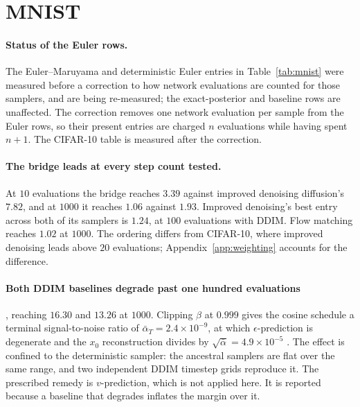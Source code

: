 \documentclass[11pt,a4paper]{article}
\begin{document}
\section{MNIST}
\label{sec:mnist}

\begin{table}[h]
\centering\small
\caption{MNIST, FID against the train split, $50\,000$ generated samples per
entry, floor $0.15$. Mean $\pm$ sd over sampling seeds where repeats were run; a
dash marks a cell not run.}
\label{tab:mnist}
\setlength{\tabcolsep}{4pt}
\resizebox{\textwidth}{!}{}
\end{table}

\paragraph{Status of the Euler rows.} The Euler--Maruyama and deterministic
Euler entries in Table~\ref{tab:mnist} were measured before a correction to how
network evaluations are counted for those samplers, and are being re-measured;
the exact-posterior and baseline rows are unaffected. The correction removes one
network evaluation per sample from the Euler rows, so their present entries are
charged $n$ evaluations while having spent $n+1$. The CIFAR-10 table is measured
after the correction.

\paragraph{The bridge leads at every step count tested.} At $10$ evaluations the
bridge reaches $3.39$ against improved denoising diffusion's $7.82$, and at
$1000$ it reaches $1.06$ against $1.93$. Improved denoising's best entry across
both of its samplers is $1.24$, at $100$ evaluations with DDIM. Flow matching
reaches $1.02$ at $1000$. The ordering differs from CIFAR-10, where improved
denoising leads above $20$ evaluations; Appendix~\ref{app:weighting} accounts for
the difference.

\paragraph{Both DDIM baselines degrade past one hundred evaluations}, reaching
$16.30$ and $13.26$ at $1000$. Clipping $\beta$ at $0.999$ gives the cosine
schedule a terminal signal-to-noise ratio of $\bar\alpha_T=2.4\times10^{-9}$, at
which $\epsilon$-prediction is degenerate and the $x_0$ reconstruction divides by
$\sqrt{\bar\alpha}=4.9\times10^{-5}$ \cite{lin2024}. The effect is confined to
the deterministic sampler: the ancestral samplers are flat over the same range,
and two independent DDIM timestep grids reproduce it. The prescribed remedy is
$v$-prediction, which is not applied here. It is reported because a baseline
that degrades inflates the margin over it.
\end{document}
